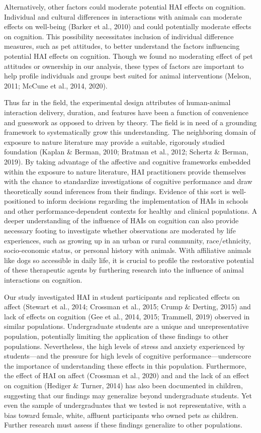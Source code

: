 \documentclass[
  english,
  pub,floatsintext]{apa6}
\begin{document}
Alternatively, other factors could moderate potential HAI effects on cognition. Individual and cultural differences in interactions with animals can moderate effects on well-being (Barker et al., 2010) and could potentially moderate effects on cognition. This possibility necessitates inclusion of individual difference measures, such as pet attitudes, to better understand the factors influencing potential HAI effects on cognition. Though we found no moderating effect of pet attitudes or ownership in our analysis, these types of factors are important to help profile individuals and groups best suited for animal interventions (Melson, 2011; McCune et al., 2014, 2020).

Thus far in the field, the experimental design attributes of human-animal interaction delivery, duration, and features have been a function of convenience and guesswork as opposed to driven by theory. The field is in need of a grounding framework to systematically grow this understanding. The neighboring domain of exposure to nature literature may provide a suitable, rigorously studied foundation (Kaplan \& Berman, 2010; Bratman et al., 2012; Schertz \& Berman, 2019). By taking advantage of the affective and cognitive frameworks embedded within the exposure to nature literature, HAI practitioners provide themselves with the chance to standardize investigations of cognitive performance and draw theoretically sound inferences from their findings. Evidence of this sort is well-positioned to inform decisions regarding the implementation of HAIs in schools and other performance-dependent contexts for healthy and clinical populations. A deeper understanding of the influence of HAIs on cognition can also provide necessary footing to investigate whether observations are moderated by life experiences, such as growing up in an urban or rural community, race/ethnicity, socio-economic status, or personal history with animals. With affiliative animals like dogs so accessible in daily life, it is crucial to profile the restorative potential of these therapeutic agents by furthering research into the influence of animal interactions on cognition.

Our study investigated HAI in student participants and replicated effects on affect (Stewart et al., 2014; Crossman et al., 2015; Crump \& Derting, 2015) and lack of effects on cognition (Gee et al., 2014, 2015; Trammell, 2019) observed in similar populations. Undergraduate students are a unique and unrepresentative population, potentially limiting the application of these findings to other populations. Nevertheless, the high levels of stress and anxiety experienced by students---and the pressure for high levels of cognitive performance---underscore the importance of understanding these effects in this population. Furthermore, the effect of HAI on affect (Crossman et al., 2020) and and the lack of an effect on cognition (Hediger \& Turner, 2014) has also been documented in children, suggesting that our findings may generalize beyond undergraduate students. Yet even the sample of undergraduates that we tested is not representative, with a bias toward female, white, affluent participants who owned pets as children. Further research must assess if these findings generalize to other populations.
\end{document}
